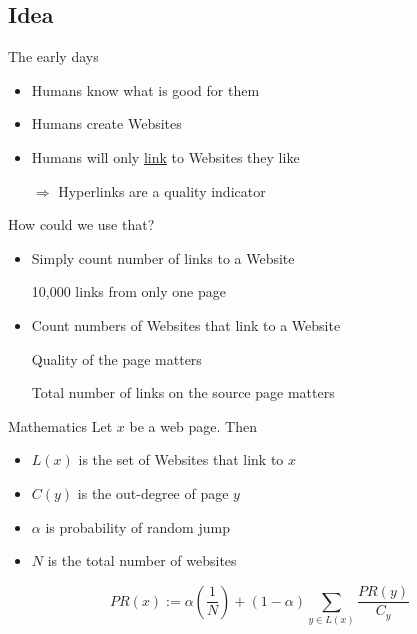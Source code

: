 \subsection{Idea}
\begin{frame}{The early days}
    \begin{itemize}[<+->]
        \item Humans know what is good for them
        \item Humans create Websites
        \item Humans will only \href{http://en.wikipedia.org/wiki/Hyperlink}{link} to Websites they like
        \item[$\Rightarrow$] Hyperlinks are a quality indicator
    \end{itemize}
\end{frame}

\begin{frame}{How could we use that?}
    \begin{itemize}[<+->]
        \item Simply count number of links to a Website
        \item[\xmark] 10,000 links from only one page
        \item Count numbers of Websites that link to a Website
        \item[\xmark] Quality of the page matters
        \item[\xmark] Total number of links on the source page matters
    \end{itemize}
\end{frame}

\begin{frame}{Mathematics}
    Let $x$ be a web page. Then
    \begin{itemize}
        \item $L(x)$ is the set of Websites that link to $x$
        \item $C(y)$ is the out-degree of page $y$
        \item $\alpha$ is probability of random jump
        \item $N$ is the total number of websites
    \end{itemize}

    \[\displaystyle PR(x) := \alpha \left ( \frac{1}{N} \right ) + (1-\alpha) \sum_{y\in L(x)} \frac{PR(y)}{C_{y}}\]
\end{frame}

